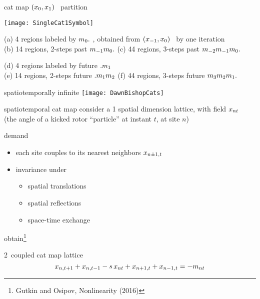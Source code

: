 \begin{frame}{cat map $(x_{0},x_{1})$  \statesp\ partition}
\begin{center}
	\texttt{[image: SingleCat1Symbol]}
\end{center}

{\scriptsize
(a) 4 regions labeled by ${m_{0}}.$ , obtained from
$(x_{-1},x_{0})$ \statesp\ by one iteration
\\
(b) 14 regions, 2-steps past ${m_{-1}}{m_{0}}.$
(c) 44 regions, 3-steps past ${m_{-2}}{m_{-1}}{m_{0}}.$

\medskip

(d) 4 regions labeled by future $.{m_{1}}$
\\
(e) 14 regions, 2-steps  future $.{m_{1}}{m_{2}}$
(f) 44 regions, 3-steps future {\brick} ${m_{3}}{m_{2}}{m_{1}}.$
}
\end{frame}

\begin{frame}{spatiotemporally infinite \catlatt}
\hfill\texttt{[image: DawnBishopCats]}
\end{frame}


\begin{frame}{spatiotemporal cat map}
consider
a 1 spatial dimension lattice, with field
$x_{nt}$ \\
(the angle of a kicked
rotor ``particle'' at instant $t$, at site $n$)
\begin{block}{demand}
\begin{itemize}
\item  each site couples to
its nearest neighbors $x_{n\pm1,t}$
\item invariance under
    \begin{itemize}
        \item spatial translations
        \item  spatial reflections
        \item  space-time exchange
     \end{itemize}
\end{itemize}
\end{block}

\bigskip

obtain\footnote{Gutkin and Osipov, Nonlinearity (2016)}
\begin{block}{2\dmn\ coupled cat map lattice}
\[
x_{n,t+1} + x_{n,t-1} - s \, x_{n t} + x_{n+1,t} + x_{n-1, t}
     =-{m_{n t}}
\] %
\end{block}
\end{frame}

